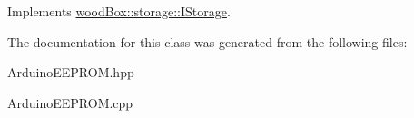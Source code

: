 Implements \mbox{\hyperlink{classwood_box_1_1storage_1_1_i_storage_a5eb82c922e8a3147ddab510706be8e24}{wood\+Box\+::storage\+::\+I\+Storage}}.



The documentation for this class was generated from the following files\+:\begin{DoxyCompactItemize}
\item 
Arduino\+E\+E\+P\+R\+O\+M.\+hpp\item 
Arduino\+E\+E\+P\+R\+O\+M.\+cpp\end{DoxyCompactItemize}
